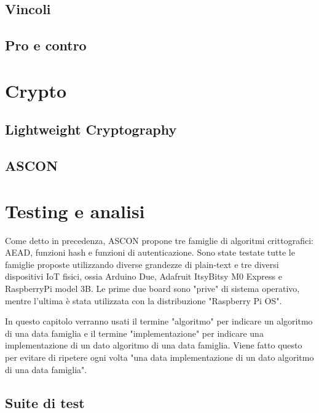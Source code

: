 \documentclass[12pt,a4paper,italian]{report}
\begin{document}
\section{Vincoli}

\section{Pro e contro}

\newpage

\chapter{Crypto}

\section{Lightweight Cryptography}

\section{ASCON}

\newpage

\chapter{Testing e analisi}

Come detto in precedenza, ASCON propone tre famiglie di algoritmi crittografici: AEAD, funzioni hash e funzioni di autenticazione. Sono state testate tutte le famiglie proposte utilizzando diverse grandezze di plain-text e tre diversi dispositivi IoT fisici, ossia Arduino Due, Adafruit ItsyBitsy M0 Express e RaspberryPi model 3B. Le prime due board sono "prive" di sistema operativo, mentre l'ultima è stata utilizzata con la distribuzione "Raspberry Pi OS". \

\noindent In questo capitolo verranno usati il termine "algoritmo" per indicare un algoritmo di una data famiglia e il termine "implementazione" per indicare una implementazione di un dato algoritmo di una data famiglia. Viene fatto questo per evitare di ripetere ogni volta "una data implementazione di un dato algoritmo di una data famiglia".

\section{Suite di test}
\end{document}
